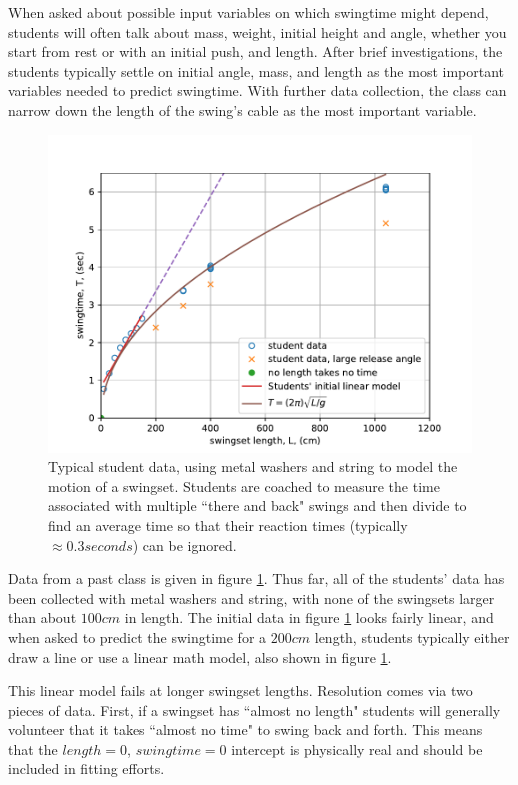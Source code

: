 \documentclass[12pt]{iopart}
\begin{document}
When asked about possible input variables on which swingtime might depend, students will often talk about mass, weight, initial height and angle, whether you start from rest or with an initial push, and length.  
After brief investigations, the students typically settle on initial angle, mass, and length as the most important variables needed to predict swingtime.  
With further data collection, the class can narrow down the length of the swing's cable as the most important variable.  

\begin{figure}[h]
\centering
	\includegraphics[width=\columnwidth]{linear_swingtime_graph.pdf}
\caption{
Typical student data, using metal washers and string to model the motion of a swingset.
        Students are coached to measure the time associated with multiple ``there and back" swings and then divide to find an average time so that their reaction times (typically $\approx0.3 seconds$) can be ignored.
        }
        \label{swingtime_graph}
\end{figure}

Data from a past class is given in figure \ref{swingtime_graph}. Thus far, all of the students' data has been collected with metal washers and string, with none of the swingsets larger than about $100cm$ in length. The initial data in figure \ref{swingtime_graph} looks fairly linear, and when asked  to predict the swingtime for a $200cm$ length, students typically either draw a line or use a linear math model, also shown in figure \ref{swingtime_graph}.  

This linear model fails at longer swingset lengths. Resolution comes via two pieces of data.  First, if a swingset has ``almost no length" students will generally volunteer that it takes ``almost no time" to swing back and forth.  This means that the $length=0$, $swingtime=0$ intercept is physically real and should be included in fitting efforts.  
\end{document}
